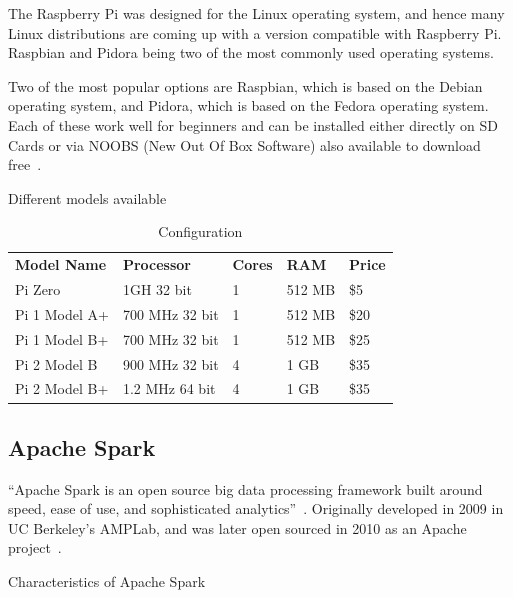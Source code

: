The Raspberry Pi was designed for the Linux operating system, and
hence many Linux distributions are coming up with a version compatible
with Raspberry Pi. Raspbian and Pidora being two of the most commonly
used operating systems.

Two of the most popular options are Raspbian, which is based on the
Debian operating system, and Pidora, which is based on the Fedora
operating system. Each of these work well for beginners and can be
installed either directly on SD Cards or via NOOBS (New Out Of Box
Software) also available to download free~\cite{hid-sp18-510-rpi}.

Different models available

\begin{table}[]
	\centering \caption{Configuration}\label{t:Different Pi Models}
        \begin{tabular}{lllll} 
        \textbf{Model Name} & \textbf{Processor} 
        & \textbf{Cores} & \textbf{RAM}& \textbf{Price}
        \\ Pi Zero & 1GH 32 bit & 1 & 512 MB & \$5
        \\ Pi 1 Model A+ & 700 MHz 32 bit & 1  & 512 MB & \$20
        \\ Pi 1 Model B+ & 700 MHz 32 bit & 1 & 512 MB & \$25
        \\ Pi 2 Model B & 900 MHz 32 bit & 4 & 1 GB & \$35
        \\ Pi 2 Model B+ & 1.2 MHz 64 bit & 4 & 1 GB & \$35        
        \\
	\end{tabular}
\end{table}

\subsection{Apache Spark}

``Apache Spark is an open source big data processing framework built
around speed, ease of use, and sophisticated
analytics''~\cite{hid-sp18-510-spark}. Originally developed in 2009 in
UC Berkeley’s AMPLab, and was later open sourced in 2010 as an Apache
project~\cite{hid-sp18-510-spark}.

Characteristics of Apache Spark

